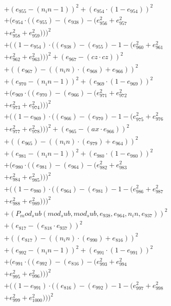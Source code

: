 \documentclass[10pt, a4paper]{article}
\begin{document}
\begin{align*}
& + (e_{955} - (n_in - 1))^{2} + (e_{954}  \cdot  (1 - e_{954}))^{2} \\
& + (e_{954}  \cdot  ((e_{955}) - (e_{938}) - (e_{956}^{2} + e_{957}^{2} \\
& + e_{958}^{2} + e_{959}^{2})))^{2} \\
& + ((1 - e_{954})  \cdot  ((e_{938}) - (e_{955}) - 1 - (e_{960}^{2} + e_{961}^{2} \\
& + e_{962}^{2} + e_{963}^{2})))^{2} + (e_{967} - (cz  \cdot  cz))^{2} \\
& + ((e_{967}) - ((n_in)  \cdot  (e_{968}) + e_{966}))^{2} \\
& + (e_{970} - (n_in - 1))^{2} + (e_{969}  \cdot  (1 - e_{969}))^{2} \\
& + (e_{969}  \cdot  ((e_{970}) - (e_{966}) - (e_{971}^{2} + e_{972}^{2} \\
& + e_{973}^{2} + e_{974}^{2})))^{2} \\
& + ((1 - e_{969})  \cdot  ((e_{966}) - (e_{970}) - 1 - (e_{975}^{2} + e_{976}^{2} \\
& + e_{977}^{2} + e_{978}^{2})))^{2} + (e_{965} - (ax  \cdot  e_{966}))^{2} \\
& + ((e_{965}) - ((n_in)  \cdot  (e_{979}) + e_{964}))^{2} \\
& + (e_{981} - (n_in - 1))^{2} + (e_{980}  \cdot  (1 - e_{980}))^{2} \\
& + (e_{980}  \cdot  ((e_{981}) - (e_{964}) - (e_{982}^{2} + e_{983}^{2} \\
& + e_{984}^{2} + e_{985}^{2})))^{2} \\
& + ((1 - e_{980})  \cdot  ((e_{964}) - (e_{981}) - 1 - (e_{986}^{2} + e_{987}^{2} \\
& + e_{988}^{2} + e_{989}^{2})))^{2} \\
& + (P_mod_sub(mod_sub, mod_sub, e_{938}, e_{964}, n_in, e_{937}))^{2} \\
& + (e_{817} - (e_{818}  \cdot  e_{937}))^{2} \\
& + ((e_{817}) - ((n_in)  \cdot  (e_{990}) + e_{816}))^{2} \\
& + (e_{992} - (n_in - 1))^{2} + (e_{991}  \cdot  (1 - e_{991}))^{2} \\
& + (e_{991}  \cdot  ((e_{992}) - (e_{816}) - (e_{993}^{2} + e_{994}^{2} \\
& + e_{995}^{2} + e_{996}^{2})))^{2} \\
& + ((1 - e_{991})  \cdot  ((e_{816}) - (e_{992}) - 1 - (e_{997}^{2} + e_{998}^{2} \\
& + e_{999}^{2} + e_{1000}^{2})))^{2} \\

\end{align*}
\end{document}
